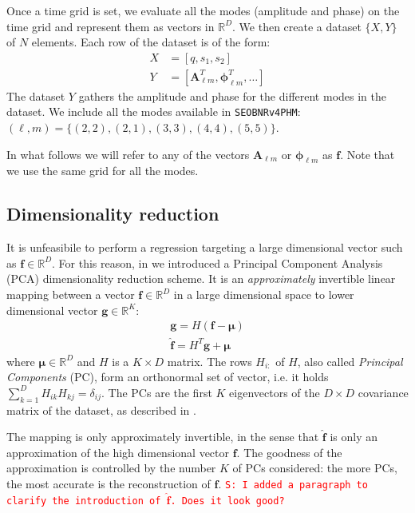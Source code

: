 \documentclass[twocolumn,showpacs,preprintnumbers,nofootinbib,prd,
superscriptaddress,10pt]{revtex4-1}
\newcommand{\R}{\mathbb{R}}
\newcommand{\stefano}[1]{{\textcolor{red}{\texttt{S: #1}} }}
\begin{document}
Once a time grid is set, we evaluate all the modes (amplitude and phase) on the time grid and represent them as vectors in $\R^D$.
We then create a dataset $\{X, Y\}$ of $N$ elements. Each row of the dataset is of the form:
\begin{align}
	X &= [q, s_1, s_2] \\
	Y &= [\boldsymbol{A}^T_{\ell m}, \boldsymbol{\phi}^T_{\ell m}, \hdots ] 
\end{align}
%
The dataset $Y$ gathers the amplitude and phase for the different modes in the dataset.
We include all the modes available in \texttt{SEOBNRv4PHM}: $(\ell, m) = \{(2,2),(2,1), (3,3), (4,4), (5,5)\}$.

In what follows we will refer to any of the vectors $\boldsymbol{A}_{\ell m}$ or $\boldsymbol{\phi}_{\ell m}$ as $\boldsymbol{f}$.
Note that we use the same grid for all the modes.

\subsection{Dimensionality reduction}
\label{sec:PCA}

It is unfeasibile to perform a regression targeting a large dimensional vector such as $\boldsymbol{f} \in \R^D$. For this reason, in \cite{Schmidt:2020yuu} we introduced a Principal Component Analysis (PCA) dimensionality reduction scheme.
It is an {\it approximately} invertible linear mapping between a vector $\boldsymbol{f} \in \R^D$ in a large dimensional space to lower dimensional vector  $\boldsymbol{g} \in \R^K$:
%
\begin{align}
	\mathbf{g} = H (\mathbf{f} - \boldsymbol{\mu}) \label{eq:PCA_reduction_model}\\
	\hat{\mathbf{f}} = H^T \mathbf{g} + \boldsymbol{\mu} \label{eq:PCA_reconstruction_model}
\end{align}
where $\boldsymbol{\mu} \in \R^D$ and $H$ is a $K \times D$ matrix.
The rows $H_{i:}$ of $H$, also called {\it Principal Components} (PC), form an orthonormal set of vector, i.e. it holds ${\sum_{k=1}^D H_{ik} H_{kj} = \delta_{ij}}$.
The PCs are the first $K$ eigenvectors of the $D \times D$ covariance matrix of the dataset, as described in \cite[Sec. 12]{murphy2012machine}.

The mapping is only approximately invertible, in the sense that $\hat{\mathbf{f}}$ is only an approximation of the high dimensional vector $\mathbf{f}$. The goodness of the approximation is controlled by the number $K$ of PCs considered: the more PCs, the most accurate is the reconstruction of $\mathbf{f}$. \stefano{I added a paragraph to clarify the introduction of $\hat{\mathbf{f}}$. Does it look good?}
\end{document}
